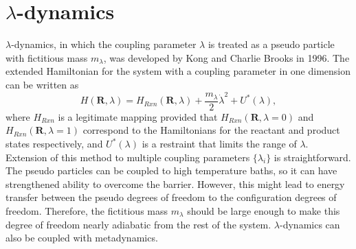 \section{$\lambda$-dynamics\label{Sec:ES:lambdadynamics}}
$\lambda$-dynamics, in which the coupling parameter $\lambda$ is treated as a pseudo particle with fictitious mass $m_\lambda$, was developed by Kong and Charlie Brooks in 1996.\cite{KongJCP1996}
The extended Hamiltonian for the system with a coupling parameter in one dimension can be written as
\begin{equation}
	H(\mathbf{R},\lambda)=H_{Rxn}(\mathbf{R},\lambda) + \frac{m_\lambda}{2}{\dot{\lambda}}^2+U^{*}(\lambda),
\end{equation}
where $H_{Rxn}$ is a legitimate mapping provided that $H_{Rxn}(\mathbf{R},\lambda=0)$ and $H_{Rxn}(\mathbf{R},\lambda=1)$ correspond to the Hamiltonians for the reactant and product states respectively, and $U^{*}(\lambda)$ is a restraint that limits the range of $\lambda$. Extension of this method to multiple coupling parameters $\{\lambda_i\}$ is straightforward. The pseudo particles can be coupled to high temperature baths, so it can have strengthened ability to overcome the barrier. However, this might lead to energy transfer between the pseudo degrees of freedom to the configuration degrees of freedom. Therefore, the fictitious mass $m_\lambda$ should be large enough to make this degree of freedom nearly adiabatic from the rest of the system.\cite{AbramsJCP2006} $\lambda$-dynamics can also be coupled with metadynamics.\cite{WuJPCL2011}